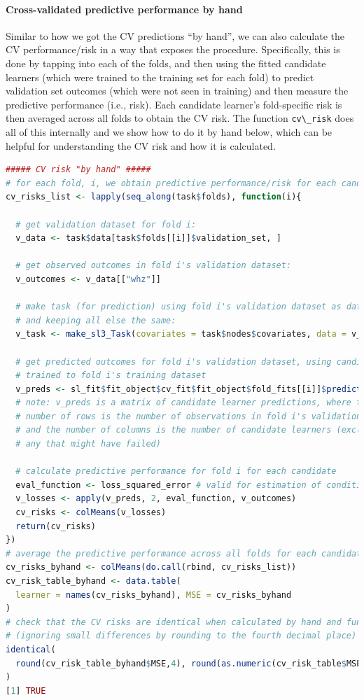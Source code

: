 \documentclass[
  12pt, krantz2,
]{krantz}
\newcommand{\passthrough}[1]{#1}
\newcommand{\1}{\mathbbm{1}}
\theoremstyle{definition}
\theoremstyle{definition}
\theoremstyle{definition}
\theoremstyle{definition}
\theoremstyle{remark}
\begin{document}
\hypertarget{cross-validated-predictive-performance-by-hand}{%
\paragraph*{Cross-validated predictive performance by hand}\label{cross-validated-predictive-performance-by-hand}}

Similar to how we got the CV predictions ``by hand'', we can also calculate the CV
performance/risk in a way that exposes the procedure. Specifically, this is done
by tapping into each of the folds, and then using the fitted candidate learners
(which were trained to the training set for each fold) to predict validation set
outcomes (which were not seen in training) and then measure the predictive
performance (i.e., risk). Each candidate learner's fold-specific risk is then
averaged across all folds to obtain the CV risk. The function \passthrough{\lstinline!cv\_risk!} does
all of this internally and we show how to do it by hand below, which can be
helpful for understanding the CV risk and how it is calculated.

\begin{lstlisting}[language=R]
##### CV risk "by hand" #####
# for each fold, i, we obtain predictive performance/risk for each candidate:
cv_risks_list <- lapply(seq_along(task$folds), function(i){
  
  # get validation dataset for fold i:
  v_data <- task$data[task$folds[[i]]$validation_set, ]
  
  # get observed outcomes in fold i's validation dataset:
  v_outcomes <- v_data[["whz"]]

  # make task (for prediction) using fold i's validation dataset as data, 
  # and keeping all else the same:
  v_task <- make_sl3_Task(covariates = task$nodes$covariates, data = v_data)
  
  # get predicted outcomes for fold i's validation dataset, using candidates 
  # trained to fold i's training dataset
  v_preds <- sl_fit$fit_object$cv_fit$fit_object$fold_fits[[i]]$predict(v_task)
  # note: v_preds is a matrix of candidate learner predictions, where the 
  # number of rows is the number of observations in fold i's validation dataset 
  # and the number of columns is the number of candidate learners (excluding 
  # any that might have failed)
  
  # calculate predictive performance for fold i for each candidate
  eval_function <- loss_squared_error # valid for estimation of conditional mean
  v_losses <- apply(v_preds, 2, eval_function, v_outcomes)
  cv_risks <- colMeans(v_losses)
  return(cv_risks)
})
# average the predictive performance across all folds for each candidate
cv_risks_byhand <- colMeans(do.call(rbind, cv_risks_list))
cv_risk_table_byhand <- data.table(
  learner = names(cv_risks_byhand), MSE = cv_risks_byhand
)
# check that the CV risks are identical when calculated by hand and function
# (ignoring small differences by rounding to the fourth decimal place)
identical(
  round(cv_risk_table_byhand$MSE,4), round(as.numeric(cv_risk_table$MSE),4)
)
[1] TRUE
\end{lstlisting}
\end{document}
